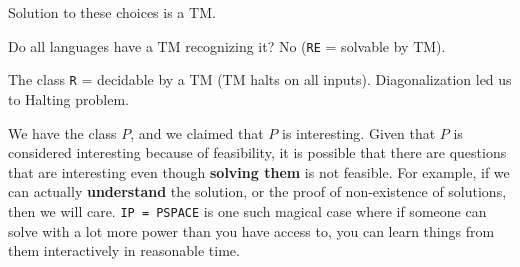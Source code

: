 Solution to these choices is a TM.


Do all languages have a TM recognizing it? No (\texttt{RE} = solvable by TM).

The class \texttt{R} = decidable by a TM (TM halts on all inputs). Diagonalization
led us to Halting problem.


We have the class $P$, and we claimed that $P$ is interesting. Given that $P$
is considered interesting because of feasibility, it is possible that there are
questions that are interesting even though \textbf{solving them} is not
feasible. For example, if we can actually \textbf{understand} the solution, or
the proof of non-existence of solutions, then we will care. \texttt{IP =
PSPACE} is one such magical case where if someone can solve with a lot more
power than you have access to, you can learn things from them interactively in
reasonable time.

